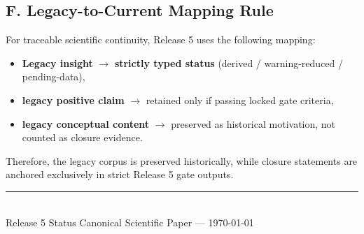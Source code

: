 \documentclass[11pt,a4paper]{article}
\begin{document}
\subsection{F. Legacy-to-Current Mapping Rule}
For traceable scientific continuity, Release 5 uses the following mapping:
\begin{itemize}[leftmargin=1.4em]
    \item \textbf{Legacy insight} $\rightarrow$ \textbf{strictly typed status} (derived / warning-reduced / pending-data),
    \item \textbf{legacy positive claim} $\rightarrow$ retained only if passing locked gate criteria,
    \item \textbf{legacy conceptual content} $\rightarrow$ preserved as historical motivation, not counted as closure evidence.
\end{itemize}
Therefore, the legacy corpus is preserved historically, while closure statements are anchored exclusively in strict Release 5 gate outputs.

\vspace{1cm}
\begin{center}
\rule{0.5\textwidth}{0.4pt}\\[0.4cm]
Release 5 Status Canonical Scientific Paper --- \today
\end{center}
\end{document}
